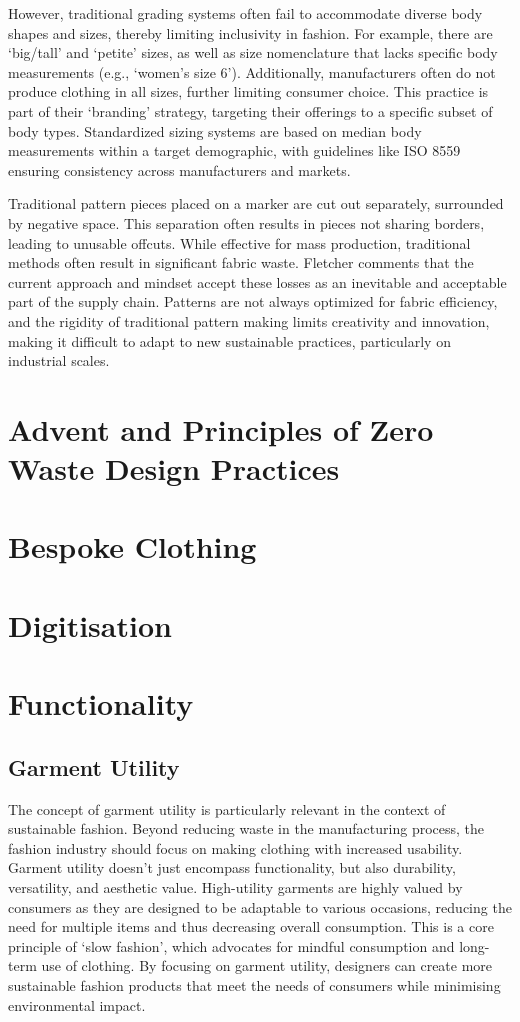 However, traditional grading systems often fail to accommodate diverse body shapes and sizes, thereby limiting inclusivity in fashion. For example, there are ‘big/tall’ and ‘petite’ sizes, as well as size nomenclature that lacks specific body measurements (e.g., ‘women’s size 6’). Additionally, manufacturers often do not produce clothing in all sizes, further limiting consumer choice. This practice is part of their ‘branding’ strategy, targeting their offerings to a specific subset of body types. Standardized sizing systems are based on median body measurements within a target demographic, with guidelines like ISO 8559 ensuring consistency across manufacturers and markets.

Traditional pattern pieces placed on a marker are cut out separately, surrounded by negative space. This separation often results in pieces not sharing borders, leading to unusable offcuts. While effective for mass production, traditional methods often result in significant fabric waste. Fletcher comments that the current approach and mindset accept these losses as an inevitable and acceptable part of the supply chain. Patterns are not always optimized for fabric efficiency, and the rigidity of traditional pattern making limits creativity and innovation, making it difficult to adapt to new sustainable practices, particularly on industrial scales.


\section{Advent and Principles of Zero Waste Design Practices}

\section{Bespoke Clothing}

\section{Digitisation}


\section{Functionality}

\subsection{Garment Utility}
The concept of garment utility is particularly relevant in the context of sustainable fashion. Beyond reducing waste in the manufacturing process, the fashion industry should focus on making clothing with increased usability. Garment utility doesn’t just encompass functionality, but also durability, versatility, and aesthetic value. High-utility garments are highly valued by consumers as they are designed to be adaptable to various occasions, reducing the need for multiple items and thus decreasing overall consumption. This is a core principle of ‘slow fashion’, which advocates for mindful consumption and long-term use of clothing. By focusing on garment utility, designers can create more sustainable fashion products that meet the needs of consumers while minimising environmental impact.

